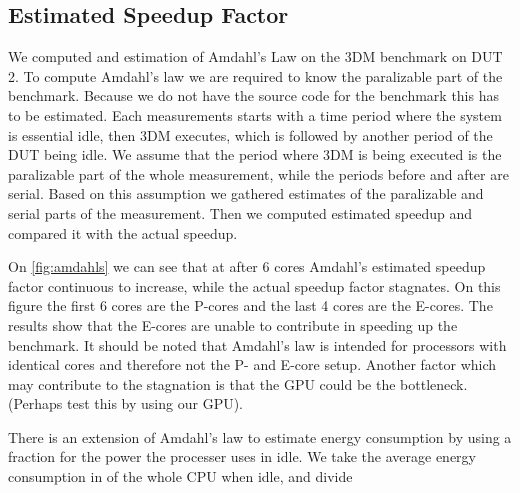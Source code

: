 \subsection{Estimated Speedup Factor}
We computed and estimation of Amdahl's Law on the 3DM benchmark on DUT 2. To compute Amdahl's law we are required to know the paralizable part of the benchmark. Because we do not have the source code for the benchmark this has to be estimated. Each measurements starts with a time period where the system is essential idle, then 3DM executes, which is followed by another period of the DUT being idle. We assume that the period where 3DM is being executed is the paralizable part of the whole measurement, while the periods before and after are serial. Based on this assumption we gathered estimates of the paralizable and serial parts of the measurement. Then we computed estimated speedup and compared it with the actual speedup.



On \cref{fig:amdahls} we can see that at after 6 cores Amdahl's estimated speedup factor continuous to increase, while the actual speedup factor stagnates. On this figure the first 6 cores are the P-cores and the last 4 cores are the E-cores. The results show that the E-cores are unable to contribute in speeding up the benchmark. It should be noted that Amdahl's law is intended for processors with identical cores and therefore not the P- and E-core setup. Another factor which may contribute to the stagnation is that the GPU could be the bottleneck. (Perhaps test this by using our GPU).



There is an extension of Amdahl's law to estimate energy consumption by using a fraction for the power the processer uses in idle. We take the average energy consumption in of the whole CPU when idle, and divide 







%
%







